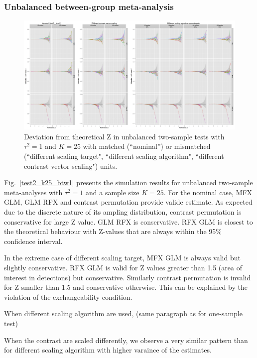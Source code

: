 \documentclass[preprint,12pt]{elsarticle}
\newcommand{\nStudies}{K}
\newcommand{\varBetween}{\tau^2}
\begin{document}
\subsubsection{Unbalanced between-group meta-analysis}

\begin{figure}[t]
	\centering
 	\includegraphics[width=0.99\linewidth]{./figures/test3_btw1.png}
	\caption{Deviation from theoretical Z in unbalanced two-sample tests with $\varBetween=1$ and $\nStudies = 25$ with matched (``nominal'') or mismatched (``different scaling target", ``different scaling algorithm", ``different contrast vector scaling") units.}
	\label{test3_btw1}
\end{figure}

Fig.~\ref{test2_k25_btw1} presents the simulation results for unbalanced two-sample meta-analyses with $\varBetween=1$ and a sample size $\nStudies = 25$. For the nominal case, MFX GLM, GLM RFX and contrast permutation provide valide estimate. As expected due to the discrete nature of its ampling distribution, contrast permutation is conservative for large Z value. GLM RFX is conservative. RFX GLM is closest to the theoretical behaviour with Z-values that are always within the 95\% confidence interval.

In the extreme case of different scaling target, MFX GLM is always valid but slightly conservative. RFX GLM is valid for Z values greater than 1.5 (area of interest in detections) but conservative. Similarly contrast permutation is invalid for Z smaller than 1.5 and conservative otherwise. This can be explained by the violation of the exchangeability condition.

When different scaling algorithm are used, (same paragraph as for one-sample test)

When the contrast are scaled differently, we observe a very similar pattern than for different scaling algorithm with higher varaince of the estimates.
\end{document}
